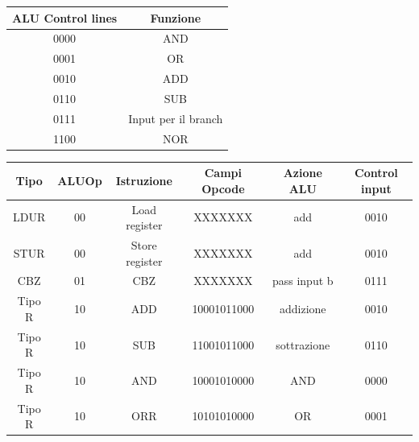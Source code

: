 \documentclass[12pt,a4paper]{article}
\begin{document}
\begin{center}\begin{tabular}{|c|c|}
\hline
\rowcolor[HTML]{FFCB2F} 
ALU Control lines & Funzione \\ \hline
0000 & AND \\ \hline
0001 & OR \\ \hline
0010 & ADD \\ \hline
0110 & SUB \\ \hline
0111 & Input per il branch \\ \hline
1100 & NOR \\ \hline
\end{tabular}

\begin{tabular}{|c|c|c|c|c|c|}
\hline
\rowcolor[HTML]{FFCB2F} 
Tipo & ALUOp & Istruzione & Campi Opcode & Azione ALU & Control input \\ \hline
LDUR & 00 & Load register & XXXXXXX & add & 0010 \\ \hline
STUR & 00 & Store register & XXXXXXX & add & 0010 \\ \hline
CBZ & 01 & CBZ & XXXXXXX & pass input b & 0111 \\ \hline
Tipo R & 10 & ADD & 10001011000 & addizione & 0010 \\ \hline
Tipo R & 10 & SUB & 11001011000 & sottrazione & 0110 \\ \hline
Tipo R & 10 & AND & 10001010000 & AND & 0000 \\ \hline
Tipo R & 10 & ORR & 10101010000 & OR & 0001 \\ \hline
\end{tabular}\end{center}
\end{document}
